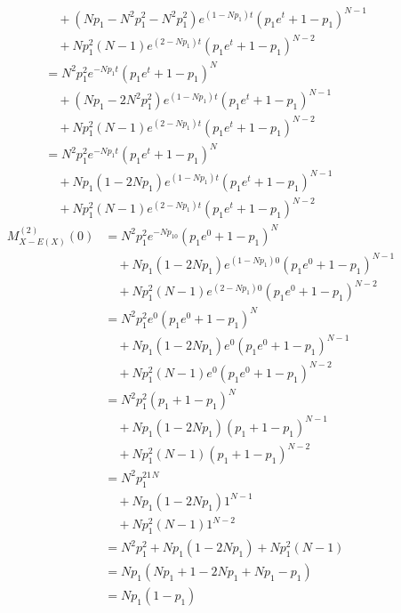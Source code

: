 \documentclass[dvipdfmx]{jsarticle}
\begin{document}
\begin{align}
  &\quad+\left(Np_1-N^2p_1^2-N^2p_1^2\right)e^{\left(1-Np_1\right)t}\left(p_1e^t+1-p_1\right)^{N-1}\nonumber\\
  &\quad+Np_1^2\left(N-1\right)e^{\left(2-Np_1\right)t}\left(p_1e^t+1-p_1\right)^{N-2}\nonumber\\
  &=N^2p_1^2e^{-Np_1t}\left(p_1e^t+1-p_1\right)^N\nonumber\\
  &\quad+\left(Np_1-2N^2p_1^2\right)e^{\left(1-Np_1\right)t}\left(p_1e^t+1-p_1\right)^{N-1}\nonumber\\
  &\quad+Np_1^2\left(N-1\right)e^{\left(2-Np_1\right)t}\left(p_1e^t+1-p_1\right)^{N-2}\nonumber\\
  &=N^2p_1^2e^{-Np_1t}\left(p_1e^t+1-p_1\right)^N\nonumber\\
  &\quad+Np_1\left(1-2Np_1\right)e^{\left(1-Np_1\right)t}\left(p_1e^t+1-p_1\right)^{N-1}\nonumber\\
  &\quad+Np_1^2\left(N-1\right)e^{\left(2-Np_1\right)t}\left(p_1e^t+1-p_1\right)^{N-2}
 \end{align}
 \begin{align}
  M_{X-E\left(X\right)}^{\left(2\right)}\left(0\right)&=N^2p_1^2e^{-Np_10}\left(p_1e^0+1-p_1\right)^N\nonumber\\
  &\quad+Np_1\left(1-2Np_1\right)e^{\left(1-Np_1\right)0}\left(p_1e^0+1-p_1\right)^{N-1}\nonumber\\
  &\quad+Np_1^2\left(N-1\right)e^{\left(2-Np_1\right)0}\left(p_1e^0+1-p_1\right)^{N-2}\nonumber\\
  &=N^2p_1^2e^0\left(p_1e^0+1-p_1\right)^N\nonumber\\
  &\quad+Np_1\left(1-2Np_1\right)e^0\left(p_1e^0+1-p_1\right)^{N-1}\nonumber\\
  &\quad+Np_1^2\left(N-1\right)e^0\left(p_1e^0+1-p_1\right)^{N-2}\nonumber\\
  &=N^2p_1^2\left(p_1+1-p_1\right)^N\nonumber\\
  &\quad+Np_1\left(1-2Np_1\right)\left(p_1+1-p_1\right)^{N-1}\nonumber\\
  &\quad+Np_1^2\left(N-1\right)\left(p_1+1-p_1\right)^{N-2}\nonumber\\
  &=N^2p_1^21^N\nonumber\\
  &\quad+Np_1\left(1-2Np_1\right)1^{N-1}\nonumber\\
  &\quad+Np_1^2\left(N-1\right)1^{N-2}\nonumber\\
  &=N^2p_1^2+Np_1\left(1-2Np_1\right)+Np_1^2\left(N-1\right)\nonumber\\
  &=Np_1\left(Np_1+1-2Np_1+Np_1-p_1\right)\nonumber\\
  &=Np_1\left(1-p_1\right)\nonumber\\
 \end{align}
\end{document}
